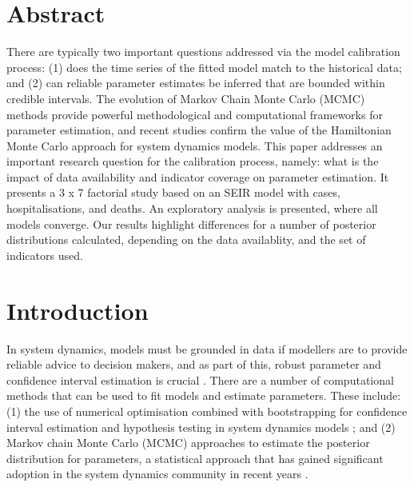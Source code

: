 \documentclass[10pt,letterpaper]{article}
\begin{document}
\section*{Abstract}
There are typically two important questions addressed via the model calibration process: (1) does the time series of the fitted model match to the historical data; and (2) can reliable parameter estimates be inferred that are bounded within credible intervals. The evolution of Markov Chain Monte Carlo (MCMC) methods provide powerful methodological and computational frameworks for parameter estimation, and recent studies confirm the value of the Hamiltonian Monte Carlo approach for system dynamics models. This paper addresses an important research question for the calibration process, namely: what is the impact of data availability and indicator coverage on parameter estimation. It presents a 3 x 7 factorial study based on an SEIR model with cases, hospitalisations, and deaths. An exploratory analysis is presented, where all models converge. Our results highlight differences for a number of posterior distributions calculated, depending on the data availablity, and the set of indicators used.



\linenumbers

\newpage

\hypertarget{introduction}{%
\section{Introduction}\label{introduction}}

In system dynamics, models must be grounded in data if modellers are to provide reliable advice to decision makers, and as part of this, robust parameter and confidence interval estimation is crucial \citep{struben2015parameter}. There are a number of computational methods that can be used to fit models and estimate parameters. These include: (1) the use of numerical optimisation combined with bootstrapping for confidence interval estimation and hypothesis testing in system dynamics models \citep{https://doi.org/10.1002/sdr.362}; and (2) Markov chain Monte Carlo (MCMC) approaches to estimate the posterior distribution for parameters, a statistical approach that has gained significant adoption in the system dynamics community in recent years \citep{https://doi.org/10.1002/sdr.1501, osgood2015combining, https://doi.org/10.1002/sdr.1693, ANDRADE2020100415, doi:10.1098/rsos.230515, https://doi.org/10.1002/sdr.1673, 10.1371/journal.pcbi.1010100}.
\end{document}
